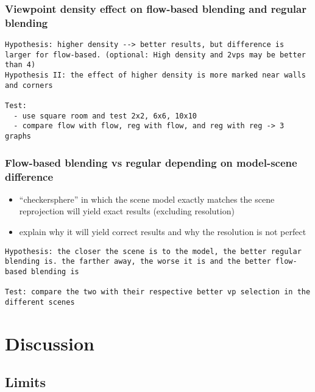 \subsubsection{Viewpoint density effect on flow-based blending and regular blending}
\begin{verbatim}
Hypothesis: higher density --> better results, but difference is larger for flow-based. (optional: High density and 2vps may be better than 4)
Hypothesis II: the effect of higher density is more marked near walls and corners

Test:
  - use square room and test 2x2, 6x6, 10x10
  - compare flow with flow, reg with flow, and reg with reg -> 3 graphs

\end{verbatim}

\subsubsection{Flow-based blending vs regular depending on model-scene difference}
\begin{itemize}
  \item ``checkersphere'' in which the scene model exactly matches the scene \ar reprojection will yield exact results (excluding resolution)
  \item explain why it will yield correct results and why the resolution is not perfect
\end{itemize}
\begin{verbatim}
Hypothesis: the closer the scene is to the model, the better regular blending is. the farther away, the worse it is and the better flow-based blending is

Test: compare the two with their respective better vp selection in the different scenes

\end{verbatim}


\section{Discussion}

\subsection{Limits}

